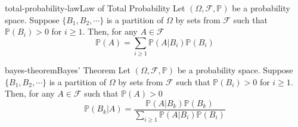 \documentclass[preview]{standalone}
\begin{document}
\begin{snippettheorem}{total-probability-law}{Law of Total Probability}
    Let \((\Omega, \mathcal{F}, \mathbb{P})\) be a probability space.
    Suppose \(\{B_1,B_2, \cdots\}\) is a partition of \(\Omega\) by sets from \(\mathcal{F}\)
    such that \(\mathbb{P}(B_i) > 0\) for \(i \geq 1\).
    Then, for any \(A \in \mathcal{F}\)
    \[
        \mathbb{P}(A) = \sum_{i \geq 1} \mathbb{P}(A|B_i) \mathbb{P}(B_i)
    \]
\end{snippettheorem}


\begin{snippettheorem}{bayes-theorem}{Bayes' Theorem}
    Let \((\Omega, \mathcal{F}, \mathbb{P})\) be a probability space.
    Suppose \(\{B_1,B_2, \cdots\}\) is a partition of \(\Omega\) by sets from \(\mathcal{F}\)
    such that \(\mathbb{P}(B_i) > 0\) for \(i \geq 1\).
    Then, for any \(A \in \mathcal{F}\) such that \(\mathbb{P}(A) > 0\)
    \[
        \mathbb{P}(B_k|A) = \frac{\mathbb{P}(A|B_k)\mathbb{P}(B_k)}{\sum_{i \geq 1}\mathbb{P}(A|B_i)\mathbb{P}(B_i)}
    \]
\end{snippettheorem}

\end{document}
